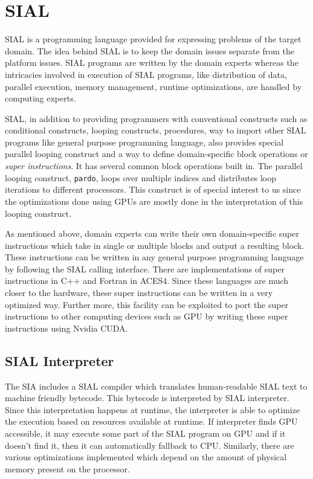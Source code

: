 \section{SIAL}
SIAL is a programming language provided for expressing problems of the target
domain. The idea behind SIAL is to keep the domain issues separate from
the platform issues. SIAL programs are written by the domain experts
whereas the intricacies involved in execution of SIAL programs, like distribution of
data, parallel execution, memory management, runtime optimizations, are handled
by computing experts.

SIAL, in addition to providing programmers with conventional constructs such as
conditional constructs, looping constructs, procedures, way to import other SIAL
programs like general purpose programming language, also provides special parallel looping construct and a way
to define domain-specific block operations or \textit{super instructions}. It
has several common block operations built in. The
parallel looping construct, \texttt{pardo}, loops over multiple indices and
distributes loop iterations to different processors. This construct is of special
interest to us since the optimizations done using GPUs are mostly done in the
interpretation of this looping construct.

As mentioned above, domain experts can write their own domain-specific
super instructions which take in single or multiple blocks and output a resulting block. These
instructions can be written in any general purpose programming language by following
the SIAL calling interface. There are implementations of super instructions in
C++ and Fortran in ACES4. Since these languages are much
closer to the hardware, these super instructions can be written in a very
optimized way. Further more, this facility can be exploited to port the super instructions to
other computing devices such as GPU by writing these super instructions using
Nvidia CUDA.

\subsection{SIAL Interpreter}
The SIA includes a SIAL compiler which translates human-readable SIAL text to
machine friendly bytecode. This bytecode is interpreted by SIAL interpreter.
Since this interpretation happens at runtime, the interpreter is able to optimize the
execution based on resources available at runtime. If interpreter finds GPU
accessible, it may execute some part of the SIAL program on GPU and if it
doesn't find it, then it can automatically fallback to CPU. Similarly, there are
various optimizations implemented which depend on the amount of physical memory
present on the processor.

